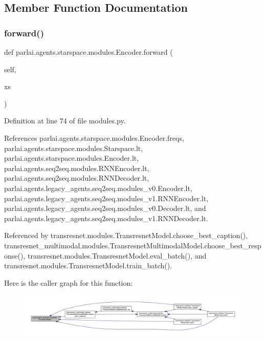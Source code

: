 \subsection{Member Function Documentation}
\mbox{\label{classparlai_1_1agents_1_1starspace_1_1modules_1_1Encoder_aec05cf4a81565a25aa85394194301cea}} 
\subsubsection{\texorpdfstring{forward()}{forward()}}
{\footnotesize\ttfamily def parlai.\+agents.\+starspace.\+modules.\+Encoder.\+forward (\begin{DoxyParamCaption}\item[{}]{self,  }\item[{}]{xs }\end{DoxyParamCaption})}



Definition at line 74 of file modules.\+py.



References parlai.\+agents.\+starspace.\+modules.\+Encoder.\+freqs, parlai.\+agents.\+starspace.\+modules.\+Starspace.\+lt, parlai.\+agents.\+starspace.\+modules.\+Encoder.\+lt, parlai.\+agents.\+seq2seq.\+modules.\+R\+N\+N\+Encoder.\+lt, parlai.\+agents.\+seq2seq.\+modules.\+R\+N\+N\+Decoder.\+lt, parlai.\+agents.\+legacy\+\_\+agents.\+seq2seq.\+modules\+\_\+v0.\+Encoder.\+lt, parlai.\+agents.\+legacy\+\_\+agents.\+seq2seq.\+modules\+\_\+v1.\+R\+N\+N\+Encoder.\+lt, parlai.\+agents.\+legacy\+\_\+agents.\+seq2seq.\+modules\+\_\+v0.\+Decoder.\+lt, and parlai.\+agents.\+legacy\+\_\+agents.\+seq2seq.\+modules\+\_\+v1.\+R\+N\+N\+Decoder.\+lt.



Referenced by transresnet.\+modules.\+Transresnet\+Model.\+choose\+\_\+best\+\_\+caption(), transresnet\+\_\+multimodal.\+modules.\+Transresnet\+Multimodal\+Model.\+choose\+\_\+best\+\_\+response(), transresnet.\+modules.\+Transresnet\+Model.\+eval\+\_\+batch(), and transresnet.\+modules.\+Transresnet\+Model.\+train\+\_\+batch().

Here is the caller graph for this function\+:
\nopagebreak
\begin{figure}[H]
\begin{center}
\leavevmode
\includegraphics[width=350pt]{classparlai_1_1agents_1_1starspace_1_1modules_1_1Encoder_aec05cf4a81565a25aa85394194301cea_icgraph}
\end{center}
\end{figure}



